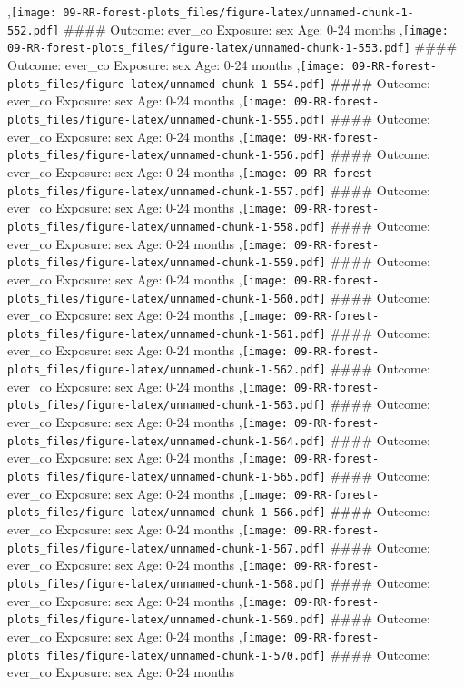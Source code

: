 \documentclass[
  9pt,
]{book}
\begin{document}
,\texttt{[image: 09-RR-forest-plots\_files/figure-latex/unnamed-chunk-1-552.pdf]}
\#\#\#\# Outcome: ever\_co Exposure: sex Age: 0-24 months
,\texttt{[image: 09-RR-forest-plots\_files/figure-latex/unnamed-chunk-1-553.pdf]}
\#\#\#\# Outcome: ever\_co Exposure: sex Age: 0-24 months
,\texttt{[image: 09-RR-forest-plots\_files/figure-latex/unnamed-chunk-1-554.pdf]}
\#\#\#\# Outcome: ever\_co Exposure: sex Age: 0-24 months
,\texttt{[image: 09-RR-forest-plots\_files/figure-latex/unnamed-chunk-1-555.pdf]}
\#\#\#\# Outcome: ever\_co Exposure: sex Age: 0-24 months
,\texttt{[image: 09-RR-forest-plots\_files/figure-latex/unnamed-chunk-1-556.pdf]}
\#\#\#\# Outcome: ever\_co Exposure: sex Age: 0-24 months
,\texttt{[image: 09-RR-forest-plots\_files/figure-latex/unnamed-chunk-1-557.pdf]}
\#\#\#\# Outcome: ever\_co Exposure: sex Age: 0-24 months
,\texttt{[image: 09-RR-forest-plots\_files/figure-latex/unnamed-chunk-1-558.pdf]}
\#\#\#\# Outcome: ever\_co Exposure: sex Age: 0-24 months
,\texttt{[image: 09-RR-forest-plots\_files/figure-latex/unnamed-chunk-1-559.pdf]}
\#\#\#\# Outcome: ever\_co Exposure: sex Age: 0-24 months
,\texttt{[image: 09-RR-forest-plots\_files/figure-latex/unnamed-chunk-1-560.pdf]}
\#\#\#\# Outcome: ever\_co Exposure: sex Age: 0-24 months
,\texttt{[image: 09-RR-forest-plots\_files/figure-latex/unnamed-chunk-1-561.pdf]}
\#\#\#\# Outcome: ever\_co Exposure: sex Age: 0-24 months
,\texttt{[image: 09-RR-forest-plots\_files/figure-latex/unnamed-chunk-1-562.pdf]}
\#\#\#\# Outcome: ever\_co Exposure: sex Age: 0-24 months
,\texttt{[image: 09-RR-forest-plots\_files/figure-latex/unnamed-chunk-1-563.pdf]}
\#\#\#\# Outcome: ever\_co Exposure: sex Age: 0-24 months
,\texttt{[image: 09-RR-forest-plots\_files/figure-latex/unnamed-chunk-1-564.pdf]}
\#\#\#\# Outcome: ever\_co Exposure: sex Age: 0-24 months
,\texttt{[image: 09-RR-forest-plots\_files/figure-latex/unnamed-chunk-1-565.pdf]}
\#\#\#\# Outcome: ever\_co Exposure: sex Age: 0-24 months
,\texttt{[image: 09-RR-forest-plots\_files/figure-latex/unnamed-chunk-1-566.pdf]}
\#\#\#\# Outcome: ever\_co Exposure: sex Age: 0-24 months
,\texttt{[image: 09-RR-forest-plots\_files/figure-latex/unnamed-chunk-1-567.pdf]}
\#\#\#\# Outcome: ever\_co Exposure: sex Age: 0-24 months
,\texttt{[image: 09-RR-forest-plots\_files/figure-latex/unnamed-chunk-1-568.pdf]}
\#\#\#\# Outcome: ever\_co Exposure: sex Age: 0-24 months
,\texttt{[image: 09-RR-forest-plots\_files/figure-latex/unnamed-chunk-1-569.pdf]}
\#\#\#\# Outcome: ever\_co Exposure: sex Age: 0-24 months
,\texttt{[image: 09-RR-forest-plots\_files/figure-latex/unnamed-chunk-1-570.pdf]}
\#\#\#\# Outcome: ever\_co Exposure: sex Age: 0-24 months
\end{document}
